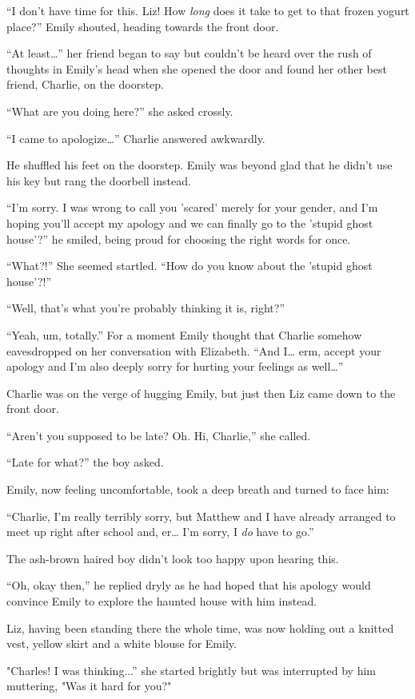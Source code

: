“I don't have time for this. Liz! How \textit{long} does it take to get to that frozen yogurt place?” Emily shouted, heading towards the front door.

“At least…” her friend began to say but couldn't be heard over the rush of thoughts in Emily's head when she opened the door and found her other best friend, Charlie, on the doorstep.

“What are you doing here?” she asked crossly.

“I came to apologize…” Charlie answered awkwardly.

He shuffled his feet on the doorstep. Emily was beyond glad that he didn't use his key but rang the doorbell instead.

“I'm sorry. I was wrong to call you 'scared' merely for your gender, and I'm hoping you'll accept my apology and we can finally go to the 'stupid ghost house'?” he smiled, being proud for choosing the right words for once.

“What?!” She seemed startled. “How do you know about the 'stupid ghost house'?!”

“Well, that's what you're probably thinking it is, right?”

“Yeah, um, totally.” For a moment Emily thought that Charlie somehow eavesdropped on her conversation with Elizabeth. “And I… erm, accept your apology and I'm also deeply sorry for hurting your feelings as well…”

Charlie was on the verge of hugging Emily, but just then Liz came down to the front door.

“Aren't you supposed to be late? Oh. Hi, Charlie,” she called.

“Late for what?” the boy asked.

Emily, now feeling uncomfortable, took a deep breath and turned to face him:

“Charlie, I'm really terribly sorry, but Matthew and I have already arranged to meet up right after school and, er… I'm sorry, I \textit{do} have to go.”

The ash-brown haired boy didn't look too happy upon hearing this.

“Oh, okay then,” he replied dryly as he had hoped that his apology would convince Emily to explore the haunted house with him instead.

Liz, having been standing there the whole time, was now holding out a knitted vest, yellow skirt and a white blouse for Emily.

"Charles! I was thinking...” she started brightly but was interrupted by him muttering, "Was it hard for you?"

